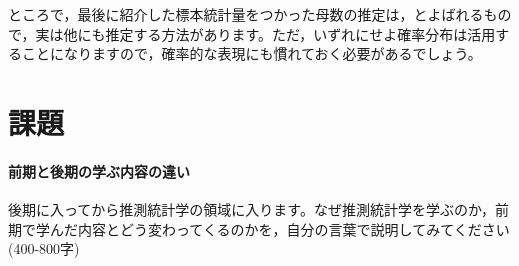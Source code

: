 \documentclass{ltjsbook}
\begin{document}
ところで，最後に紹介した標本統計量をつかった母数の推定は，とよばれるもので，実は他にも推定する方法があります。ただ，いずれにせよ確率分布は活用することになりますので，確率的な表現にも慣れておく必要があるでしょう。

\section{課題}
\paragraph{前期と後期の学ぶ内容の違い}後期に入ってから推測統計学の領域に入ります。なぜ推測統計学を学ぶのか，前期で学んだ内容とどう変わってくるのかを，自分の言葉で説明してみてください(400-800字)
\end{document}
